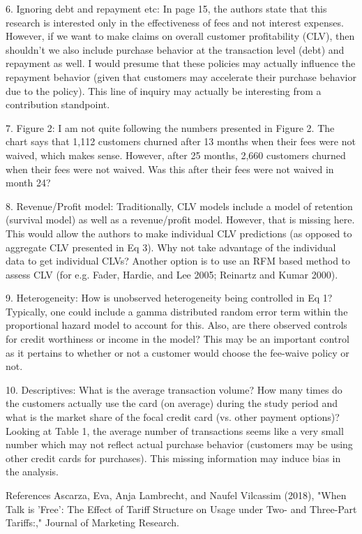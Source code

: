 6.	Ignoring debt and repayment etc: In page 15, the authors state that this research is interested only in the effectiveness of fees and not interest expenses. However, if we want to make claims on overall customer profitability (CLV), then shouldn't we also include purchase behavior at the transaction level (debt) and repayment as well. I would presume that these policies may actually influence the repayment behavior (given that customers may accelerate their purchase behavior due to the policy). This line of inquiry may actually be interesting from a contribution standpoint.

7.	Figure 2: I am not quite following the numbers presented in Figure 2. The chart says that 1,112 customers churned after 13 months when their fees were not waived, which makes sense. However, after 25 months, 2,660 customers churned when their fees were not waived. Was this after their fees were not waived in month 24?

8.	Revenue/Profit model: Traditionally, CLV models include a model of retention (survival model) as well as a revenue/profit model. However, that is missing here. This would allow the authors to make individual CLV predictions (as opposed to aggregate CLV presented in Eq 3). Why not take advantage of the individual data to get individual CLVs? Another option is to use an RFM based method to assess CLV (for e.g. Fader, Hardie, and Lee 2005; Reinartz and Kumar 2000).

9.	Heterogeneity: How is unobserved heterogeneity being controlled in Eq 1? Typically, one could include a gamma distributed random error term within the proportional hazard model to account for this. Also, are there observed controls for credit worthiness or income in the model? This may be an important control as it pertains to whether or not a customer would choose the fee-waive policy or not.

10.	Descriptives: What is the average transaction volume? How many times do the customers actually use the card (on average) during the study period and what is the market share of the focal credit card (vs. other payment options)? Looking at Table 1, the average number of transactions seems like a very small number which may not reflect actual purchase behavior (customers may be using other credit cards for purchases). This missing information may induce bias in the analysis.

References
Ascarza, Eva, Anja Lambrecht, and Naufel Vilcassim (2018), "When Talk is 'Free': The Effect of Tariff Structure on Usage under Two- and Three-Part Tariffs:," Journal of Marketing Research.

